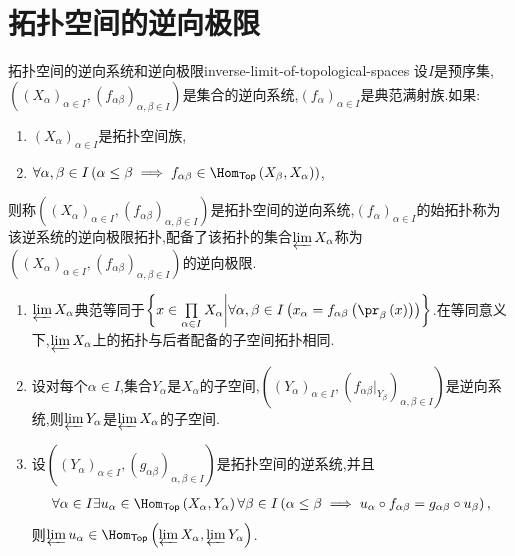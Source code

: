 \section{拓扑空间的逆向极限}

\begin{definition}{拓扑空间的逆向系统和逆向极限}{inverse-limit-of-topological-spaces}
	设$I$是预序集,$\left(\left(X_{\alpha}\right)_{\alpha\in I},\left(f_{\alpha\beta}\right)_{\alpha,\beta\in I}\right)$是集合的逆向系统,$\left(f_{\alpha}\right)_{\alpha\in I}$是典范满射族.如果:
	\begin{enumerate}
		\item $\left(X_{\alpha}\right)_{\alpha\in I}$是拓扑空间族,
		\item $\forall\alpha,\beta\in I\left(\alpha\leq\beta\implies f_{\alpha\beta}\in\Hom_{\mathsf{Top}}\left(X_{\beta},X_{\alpha}\right)\right)$,
	\end{enumerate}
	则称$\left(\left(X_{\alpha}\right)_{\alpha\in I},\left(f_{\alpha\beta}\right)_{\alpha,\beta\in I}\right)$是拓扑空间的逆向系统,$\left(f_{\alpha}\right)_{\alpha\in I}$的始拓扑称为该逆系统的逆向极限拓扑,配备了该拓扑的集合$\varprojlim X_{\alpha}$称为$\left(\left(X_{\alpha}\right)_{\alpha\in I},\left(f_{\alpha\beta}\right)_{\alpha,\beta\in I}\right)$的逆向极限.
\end{definition}

\begin{remark}{}{}
	\begin{enumerate}
		\item $\varprojlim X_{\alpha}$典范等同于$\left\{x\in\prod\limits_{\alpha\in I}X_{\alpha}\middle|\forall\alpha,\beta\in I\left(x_{\alpha}=f_{\alpha\beta}\left(\pr_{\beta}\left(x\right)\right)\right)\right\}$.在等同意义下,$\varprojlim X_{\alpha}$上的拓扑与后者配备的子空间拓扑相同.
		\item 设对每个$\alpha\in I$,集合$Y_{\alpha}$是$X_{\alpha}$的子空间,$\left(\left(Y_{\alpha}\right)_{\alpha\in I},\left(f_{\alpha\beta}|_{Y_{\beta}}\right)_{\alpha,\beta\in I}\right)$是逆向系统,则$\varprojlim Y_{\alpha}$是$\varprojlim X_{\alpha}$的子空间.
		\item 设$\left(\left(Y_{\alpha}\right)_{\alpha\in I},\left(g_{\alpha\beta}\right)_{\alpha,\beta\in I}\right)$是拓扑空间的逆系统,并且
		\begin{align*}
			\forall\alpha\in I\exists u_{\alpha}\in\Hom_{\mathsf{Top}}\left(X_{\alpha},Y_{\alpha}\right)\forall\beta\in I\left(\alpha\leq\beta\implies u_{\alpha}\circ f_{\alpha\beta}=g_{\alpha\beta}\circ u_{\beta}\right),
		\end{align*}
		则$\varprojlim u_{\alpha}\in\Hom_{\mathsf{Top}}\left(\varprojlim X_{\alpha},\varprojlim Y_{\alpha}\right)$.
	\end{enumerate}
\end{remark}

